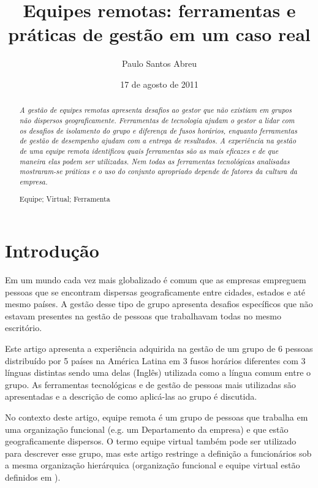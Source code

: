 \documentclass[12pt]{article} %
\title{\fontsize{15}{15}\textbf{Equipes remotas: ferramentas e práticas de gestão em um caso real}}
\author{Paulo Santos Abreu}
\date{17 de agosto de 2011} %
\begin{document}
\maketitle

\begin{abstract}
\fontsize{12}{12}\textit{A gestão de equipes remotas apresenta desafios ao gestor que não existiam em grupos não dispersos 
geograficamente. Ferramentas de tecnologia ajudam o gestor a lidar com os desafios de isolamento do grupo
e diferença de fusos horários, enquanto ferramentas de gestão de desempenho ajudam com a entrega de 
resultados. A experiência na gestão de uma equipe remota identificou quais ferramentas são as mais
eficazes e de que maneira elas podem ser utilizadas. Nem todas as ferramentas tecnológicas analisadas
mostraram-se práticas e o uso do conjunto apropriado depende de fatores da cultura da empresa.
}
 
Equipe; Virtual; Ferramenta

\end{abstract}

\section{\fontsize{12}{12}\textbf{Introdução}}

Em um mundo cada vez mais globalizado é comum que as empresas empreguem pessoas
que se encontram dispersas geograficamente entre cidades, estados e até mesmo países.
A gestão desse tipo de grupo apresenta desafios específicos que não estavam 
presentes na gestão de pessoas que trabalhavam todas no mesmo escritório.

Este artigo apresenta a experiência adquirida na gestão de um grupo de 6 pessoas distribuído
por 5 países na América Latina em 3 fusos horários diferentes com 3 línguas  
distintas sendo uma delas (Inglês) utilizada como a língua comum entre o grupo.
As ferramentas tecnológicas e de gestão de pessoas mais utilizadas 
são apresentadas e a descrição de como aplicá-las ao grupo é discutida.

No contexto deste artigo, equipe remota é um grupo de pessoas que trabalha em uma organização funcional (e.g. um Departamento da empresa) e que estão geograficamente dispersos. O termo equipe virtual 
 também pode ser utilizado para descrever esse grupo,
mas este artigo restringe a definição a funcionários sob a mesma organização hierárquica (organização funcional
	e equipe virtual estão definidos em \cite{pmbok}).
\end{document}
